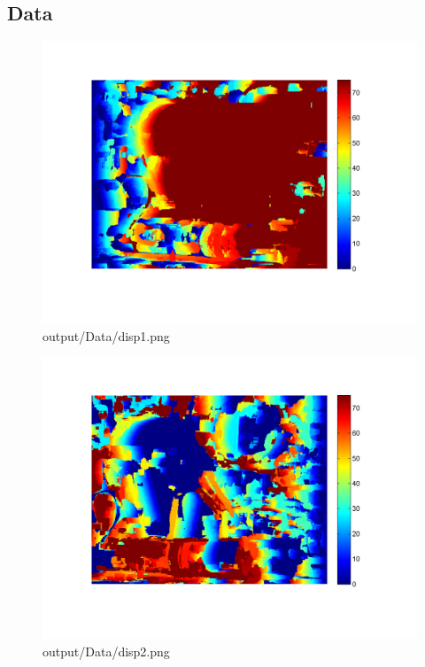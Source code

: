 \subsection{Data}
\begin{figure}[h]    \includegraphics[scale=0.5]{output/Data/disp1.png}    \caption{output/Data/disp1.png}\end{figure}
\begin{figure}[h]    \includegraphics[scale=0.5]{output/Data/disp2.png}    \caption{output/Data/disp2.png}\end{figure}

